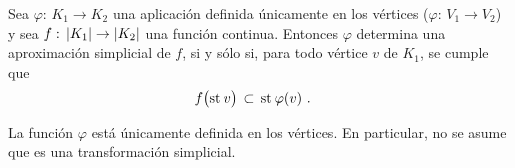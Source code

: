 \begin{teoCaracterizacionAproximacionesSimpliciales}%
	\label{thm:caracterizacionaproximacionessimpliciales}
	Sea $\varphi:\,K_{1}\rightarrow K_{2}$ una aplicaci\'{o}n
	definida \'{u}nicamente en los v\'{e}rtices
	($\varphi:\,V_{1}\rightarrow V_{2}$) y sea
	$f:\,\left|K_{1}\right|\rightarrow\left|K_{2}\right|$ una funci\'{o}n continua.
	Entonces $\varphi$ determina una aproximaci\'{o}n simplicial de $f$,
	si y s\'{o}lo si, para todo v\'{e}rtice $v$ de $K_{1}$, se cumple que
	\begin{align*}
		f\big(\mathrm{st}_{}\,v\big) &\,\subset\,\mathrm{st}_{}\,\varphi(v)
		\text{ .}
	\end{align*}
\end{teoCaracterizacionAproximacionesSimpliciales}

La funci\'{o}n $\varphi$ est\'{a} \'{u}nicamente definida en los v\'{e}rtices.
En particular, no se asume que es una transformaci\'{o}n simplicial.

